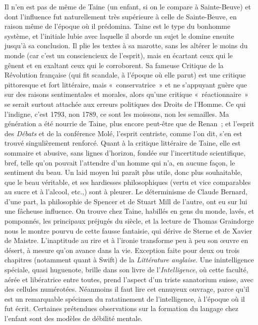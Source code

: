 \documentclass[french,twoside]{book} %
\begin{document}
Il n’en est pas de même de Taine (un enfant, si on le compare à Sainte-Beuve) et dont l’influence fut naturellement très supérieure à celle de Sainte-Beuve, en raison même de l’époque où il prédomina. Taine est le type du bonhomme système, et l’initiale lubie avec laquelle il aborde un sujet le domine ensuite jusqu’à sa conclusion. Il plie les textes à sa marotte, sans les altérer le moins du monde (car c’est un consciencieux de l’esprit), mais en écartant ceux qui le gênent et en exaltant ceux qui le corroborent. Sa fameuse Critique de la Révolution française (qui fit scandale, à l’époque où elle parut) est une critique pittoresque et fort littéraire, mais « conservatrice » et ne s’appuyant guère que sur des raisons sentimentales et morales, alors qu’une critique « réactionnaire » se serait surtout attachée aux erreurs politiques des Droits de l’Homme. Ce qui l’indigne, c’est 1793, non 1789, ce sont les moissons, non les semailles. Ma génération a été nourrie de Taine, plus encore peut-être que de Renan ; et l’esprit des {\itshape Débats} et de la conférence Molé, l’esprit centriste, comme l’on dit, s’en est trouvé singulièrement renforcé. Quant à la critique littéraire de Taine, elle est sommaire et abusive, sans lignes d’horizon, fondée sur l’incertitude scientifique, bref, telle qu’on pouvait l’attendre d’un homme qui n’a, en aucune façon, le sentiment du beau. Un laid moyen lui paraît plus utile, donc plus souhaitable, que le beau véritable, et ses hardiesses philosophiques (vertu et vice comparables au sucre et à l’alcool, etc.,) sont à pleurer. Le déterminisme de Claude Bernard, d’une part, la philosophie de Spencer et de Stuart Mill de l’autre, ont eu sur lui une fâcheuse influence. On trouve chez Taine, habillés en gens du monde, lavés, et pomponnés, les principaux préjugés du siècle, et la lecture de Thomas Graindorge nous le montre pourvu de cette fausse fantaisie, qui dérive de Sterne et de Xavier de Maistre. L’inaptitude au rire et à l’ironie transforme peu à peu son œuvre en désert, à mesure qu’on avance dans la vie. Exception faite pour deux ou trois chapitres (notamment quant à Swift) de la {\itshape Littérature anglaise}. Une inintelligence spéciale, quasi huguenote, brille dans son livre de l’{\itshape Intelligence}, où cette faculté, aérée et libératrice entre toutes, prend l’aspect d’un triste sanatorium suisse, avec des cellules numérotées. Néanmoins il faut lire cet ennuyeux ouvrage, parce qu’il est un remarquable spécimen du ratatinement de l’intelligence, à l’époque où il fut écrit. Certaines prétendues observations sur la formation du langage chez l’enfant sont des modèles de débilité mentale.\par
\end{document}

